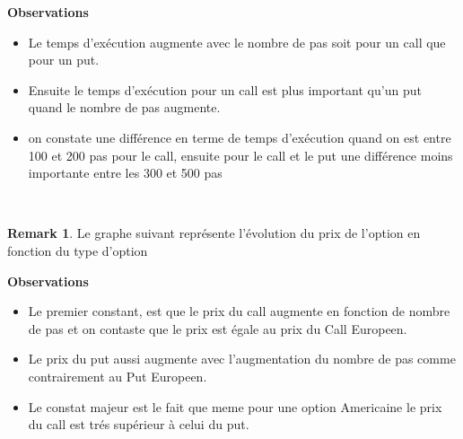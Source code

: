 \documentclass[12pt]{article}
\theoremstyle{definition}
\theoremstyle{definition}
\newtheorem*{remark}{Remark}
\begin{document}
\begin{center}
        \textbf{Observations}
\end{center}
\begin{itemize}
\item Le temps d'exécution augmente avec le nombre de pas soit pour un call que pour un put.
\item Ensuite le temps d'exécution pour un call est plus important qu'un put quand le nombre de pas augmente. 
\item on constate une différence en terme de temps d'exécution quand on est entre 100 et 200 pas pour le call, ensuite pour le call et le put une différence moins importante entre les 300 et 500
 pas
 \end{itemize} 

 \\
\begin{remark}
Le graphe suivant représente l'évolution du prix de l'option en fonction du type d'option
\end{remark}
\begin{center}
        \textbf{Observations}
\end{center}
\begin{itemize}
\item Le premier constant, est que le prix du call augmente en fonction de nombre de pas et on contaste que le prix est égale au prix du Call Europeen.
\item Le prix du put aussi augmente avec l'augmentation du nombre de pas comme contrairement au Put Europeen.
\item Le constat majeur est le fait que meme pour une option Americaine le prix du call est trés supérieur à celui du put.
\end{itemize}
\end{document}
